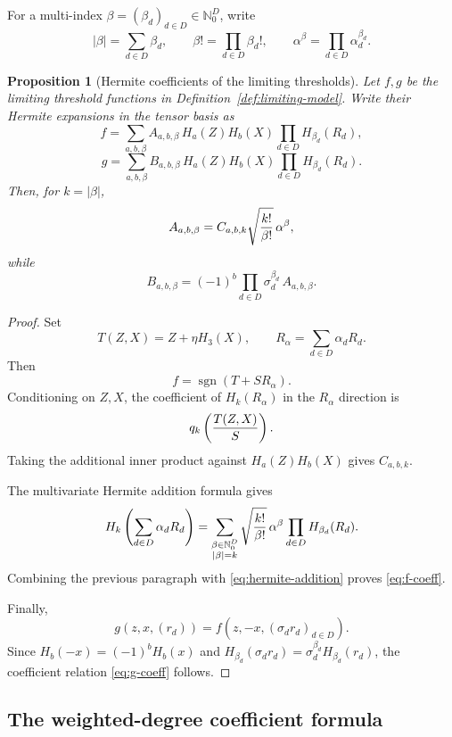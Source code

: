 \documentclass[11pt]{article}
\newcommand{\Nzero}{\mathbb N_0}
\newcommand{\1}{\mathbf 1}
\newcommand{\sgn}{\operatorname{sgn}}
\theoremstyle{plain}
\newtheorem{proposition}[theorem]{Proposition}
\theoremstyle{definition}
\theoremstyle{remark}
\begin{document}
For a multi-index $\beta=(\beta_d)_{d\in D}\in\Nzero^D$, write
\[
  |\beta|=\sum_{d\in D}\beta_d,
  \qquad
  \beta!=\prod_{d\in D}\beta_d!,
  \qquad
  \alpha^\beta=\prod_{d\in D}\alpha_d^{\beta_d}.
\]

\begin{proposition}[Hermite coefficients of the limiting thresholds]\label{prop:hermite-coefficients}
Let $f,g$ be the limiting threshold functions in Definition~\ref{def:limiting-model}.  Write their Hermite expansions in the tensor basis as
\[
  f=\sum_{a,b,\beta} A_{a,b,\beta}\,H_a(Z)H_b(X)\prod_{d\in D}H_{\beta_d}(R_d),
\]
\[
  g=\sum_{a,b,\beta} B_{a,b,\beta}\,H_a(Z)H_b(X)\prod_{d\in D}H_{\beta_d}(R_d).
\]
Then, for $k=|\beta|$,
\begin{equation}\label{eq:f-coeff}
  A_{a,b,\beta}
  =C_{a,b,k}\sqrt{k!\over \beta!}\,\alpha^\beta,
\end{equation}
while
\begin{equation}\label{eq:g-coeff}
  B_{a,b,\beta}
  =(-1)^b\prod_{d\in D}\sigma_d^{\beta_d}\,A_{a,b,\beta}.
\end{equation}
\end{proposition}

\begin{proof}
Set
\[
  T(Z,X)=Z+\eta H_3(X),
  \qquad
  R_\alpha=\sum_{d\in D}\alpha_dR_d.
\]
Then
\[
  f=\sgn(T+SR_\alpha).
\]
Conditioning on $Z,X$, the coefficient of $H_k(R_\alpha)$ in the $R_\alpha$ direction is
\[
  q_k\left({T(Z,X)\over S}\right).
\]
Taking the additional inner product against $H_a(Z)H_b(X)$ gives $C_{a,b,k}$.

The multivariate Hermite addition formula gives
\begin{equation}\label{eq:hermite-addition}
  H_k\left(\sum_{d\in D}\alpha_dR_d\right)
  =\sum_{\substack{\beta\in\Nzero^D\\ |\beta|=k}}
  \sqrt{k!\over \beta!}\,\alpha^\beta
  \prod_{d\in D}H_{\beta_d}(R_d).
\end{equation}
Combining the previous paragraph with \eqref{eq:hermite-addition} proves \eqref{eq:f-coeff}.

Finally,
\[
  g(z,x,(r_d))=f(z,-x,(\sigma_dr_d)_{d\in D}).
\]
Since $H_b(-x)=(-1)^bH_b(x)$ and $H_{\beta_d}(\sigma_dr_d)=\sigma_d^{\beta_d}H_{\beta_d}(r_d)$, the coefficient relation \eqref{eq:g-coeff} follows.
\end{proof}

\subsection{The weighted-degree coefficient formula}\label{subsec:weighted-degree-formula}
\end{document}

